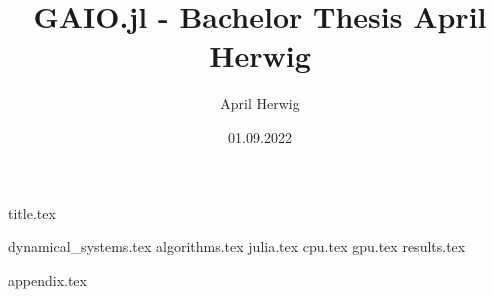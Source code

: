 \documentclass[12pt,a4paper,twoside]{article}
\title{GAIO.jl - Bachelor Thesis April Herwig}
\author{April Herwig}
\date{01.09.2022}
\numberwithin{figure}{section}
\numberwithin{equation}{section}
\theoremstyle{definition}
\theoremstyle{remark}
\theoremstyle{remark}
\begin{document}
{title.tex}

\pagestyle{headings}
\raggedbottom

{dynamical_systems.tex}
{algorithms.tex}
{julia.tex}
{cpu.tex}
{gpu.tex}
{results.tex}

\FloatBarrier

\nocite{*}
\printbibliography

{}
{appendix.tex}
\end{document}
